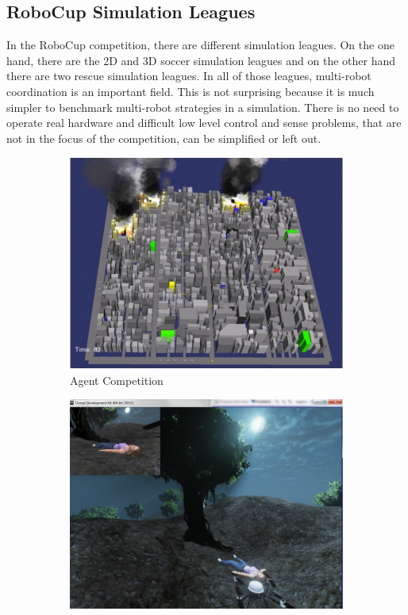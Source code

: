 \subsection{RoboCup Simulation Leagues}
In the RoboCup competition, there are different simulation leagues. On the one hand, there are the 2D and 3D soccer simulation leagues and on the other hand there are two rescue simulation leagues. In all of those leagues, multi-robot coordination is an important field. This is not surprising because it is much simpler to benchmark multi-robot strategies in a simulation. There is no need to operate real hardware and difficult low level control and sense problems, that are not in the focus of the competition, can be simplified or left out.\\
\begin{figure}
  \centering
  \begin{subfigure}[b]{0.48\textwidth}
    \includegraphics[width=\textwidth]{pics/rescue3d}
    \caption{Agent Competition~\cite{rescue3d}}
    \label{fig:rescue_agent_competition}
  \end{subfigure}
  \begin{subfigure}[b]{0.48\textwidth}
    \includegraphics[width=\textwidth]{pics/rescue_vrc}

\end{subfigure}
\end{figure}

